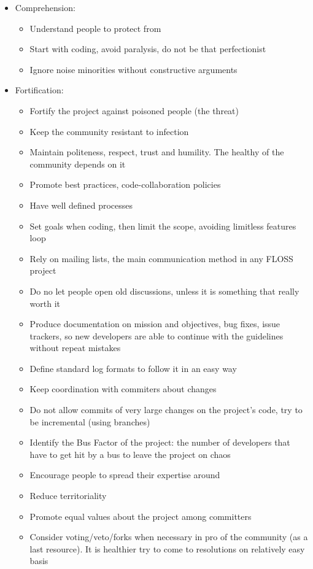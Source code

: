 \documentclass[11pt]{article} %
\begin{document}
\begin{itemize}
  \item Comprehension:
  	\begin{itemize}
  		\item Understand people to protect from
  		\item Start with coding, avoid paralysis, do not be that perfectionist
  		\item Ignore noise minorities without constructive arguments
  	\end{itemize}
  
  \item Fortification:
  	\begin{itemize}
  		\item Fortify the project against poisoned people (the threat)
  		\item Keep the community resistant to infection
  		\item Maintain politeness, respect, trust and humility. The healthy of the community depends on it
  		\item Promote best practices, code-collaboration policies
  		\item Have well defined processes
  		\item Set goals when coding, then limit the scope, avoiding limitless features loop
  		\item Rely on mailing lists, the main communication method in any FLOSS project
  		\item Do no let people open old discussions, unless it is something that really worth it
  		\item Produce documentation on mission and objectives, bug fixes, issue trackers, so new developers are able to continue with the guidelines without repeat mistakes
  		\item Define standard log formats to follow it in an easy way
  		\item Keep coordination with commiters about changes
  		\item Do not allow commits of very large changes on the project's code, try to be incremental (using branches)
  		\item Identify the Bus Factor of the project: the number of developers that have to get hit by a bus to leave the project on chaos
  		\item Encourage people to spread their expertise around
  		\item Reduce territoriality
  		\item Promote equal values about the project among committers
  		\item Consider voting/veto/forks when necessary in pro of the community (as a last resource). It is healthier try to come to resolutions on relatively easy basis
  	\end{itemize}
  	

\end{itemize}
\end{document}
